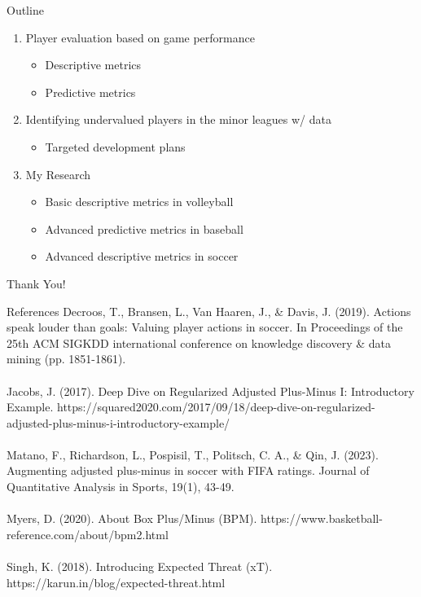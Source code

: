 \documentclass{beamer}
\begin{document}
\begin{frame}{Outline}
  \begin{enumerate}
    \item Player evaluation based on game performance
    \begin{itemize}
      \item Descriptive metrics
      \item Predictive metrics
    \end{itemize}
    \item Identifying undervalued players in the minor leagues w/ data
    \begin{itemize}
      \item Targeted development plans
    \end{itemize}
    \item My Research
    \begin{itemize}
      \item Basic descriptive metrics in volleyball
      \item Advanced predictive metrics in baseball
      \item Advanced descriptive metrics in soccer
    \end{itemize}
  \end{enumerate}
\end{frame}


\begin{frame}
  \centering
  \LARGE
  Thank You!
\end{frame}


\begin{frame}{References}
  \footnotesize
  Decroos, T., Bransen, L., Van Haaren, J., \& Davis, J. (2019). Actions speak louder than goals: Valuing player actions in soccer. In Proceedings of the 25th ACM SIGKDD international conference on knowledge discovery \& data mining (pp. 1851-1861).\\
  ~\\
  Jacobs, J. (2017). Deep Dive on Regularized Adjusted Plus-Minus I: Introductory Example. https://squared2020.com/2017/09/18/deep-dive-on-regularized-adjusted-plus-minus-i-introductory-example/\\
  ~\\
  Matano, F., Richardson, L., Pospisil, T., Politsch, C. A., \& Qin, J. (2023). Augmenting adjusted plus-minus in soccer with FIFA ratings. Journal of Quantitative Analysis in Sports, 19(1), 43-49.\\
  ~\\
  Myers, D. (2020). About Box Plus/Minus (BPM). https://www.basketball-reference.com/about/bpm2.html\\
  ~\\
  Singh, K. (2018). Introducing Expected Threat (xT). https://karun.in/blog/expected-threat.html\\
\end{frame}
\end{document}

